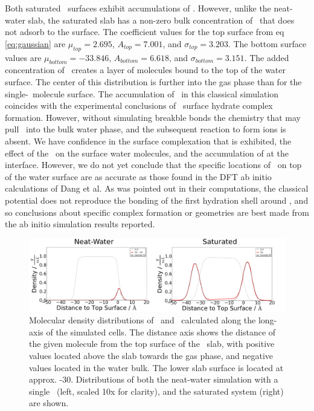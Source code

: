 Both saturated \suldiox~surfaces exhibit accumulations of \suldiox. However, unlike the neat-water slab, the saturated slab has a non-zero bulk concentration of \suldiox~that does not adsorb to the surface. The coefficient values for the top surface from eq \ref{eq:gaussian} are $\mu_{top}=2.695$, $A_{top}=7.001$, and $\sigma_{top}=3.203$. The bottom surface values are $\mu_{bottom}=-33.846$, $A_{bottom}=6.618$, and $\sigma_{bottom}=3.151$\angs. The added concentration of \suldiox~creates a layer of molecules bound to the top of the water surface. The center of this distribution is further into the gas phase than for the single-\suldiox~molecule surface. The accumulation of \suldiox~in this classical simulation coincides with the experimental conclusions of \suldiox~surface hydrate complex formation. However, without simulating breakble bonds the chemistry that may pull \suldiox~into the bulk water phase, and the subsequent reaction to form ions is absent. We have confidence in the surface complexation that is exhibited, the effect of the \suldiox~on the surface water molecules, and the accumulation of \suldiox at the interface. However, we do not yet conclude that the specific locations of \suldiox~on top of the water surface are as accurate as those found in the DFT ab initio calculations of Dang et al.\cite{Baer2010} As was pointed out in their computations, the classical potential does not reproduce the bonding of the first hydration shell around \suldiox, and so conclusions about specific complex formation or geometries are best made from the ab initio simulation results reported.

\begin{figure}[h!]
	\begin{center}
		\includegraphics[scale=1.0]{images/density/density.png}
		\caption{Molecular density distributions of \wat~and \suldiox~calculated along the long-axis of the simulated cells. The distance axis shows the distance of the given molecule from the top surface of the \wat~slab, with positive values located above the slab towards the gas phase, and negative values located in the water bulk. The lower slab surface is located at approx. -30\angs. Distributions of both the neat-water simulation with a single \suldiox~(left, scaled 10x for clarity), and the saturated system (right) are shown.}
		\label{fig:density}
	\end{center}
\end{figure}
